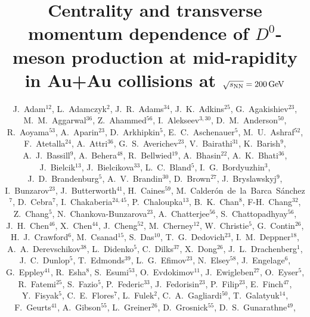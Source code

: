 \documentclass[%
 reprint,	
showpacs,
 amsmath,amssymb,
 aps,
 prc,
]{revtex4-1}
\begin{document}

\title{Centrality and transverse momentum dependence of $D^0$-meson production at mid-rapidity in Au+Au collisions at ${\sqrt{s_{\rm NN}} = \rm{200\,GeV}}$}%



\author{
J.~Adam$^{12}$,
L.~Adamczyk$^{2}$,
J.~R.~Adams$^{34}$,
J.~K.~Adkins$^{25}$,
G.~Agakishiev$^{23}$,
M.~M.~Aggarwal$^{36}$,
Z.~Ahammed$^{56}$,
I.~Alekseev$^{3,30}$,
D.~M.~Anderson$^{50}$,
R.~Aoyama$^{53}$,
A.~Aparin$^{23}$,
D.~Arkhipkin$^{5}$,
E.~C.~Aschenauer$^{5}$,
M.~U.~Ashraf$^{52}$,
F.~Atetalla$^{24}$,
A.~Attri$^{36}$,
G.~S.~Averichev$^{23}$,
V.~Bairathi$^{31}$,
K.~Barish$^{9}$,
A.~J.~Bassill$^{9}$,
A.~Behera$^{48}$,
R.~Bellwied$^{19}$,
A.~Bhasin$^{22}$,
A.~K.~Bhati$^{36}$,
J.~Bielcik$^{13}$,
J.~Bielcikova$^{33}$,
L.~C.~Bland$^{5}$,
I.~G.~Bordyuzhin$^{3}$,
J.~D.~Brandenburg$^{5}$,
A.~V.~Brandin$^{30}$,
D.~Brown$^{27}$,
J.~Bryslawskyj$^{9}$,
I.~Bunzarov$^{23}$,
J.~Butterworth$^{41}$,
H.~Caines$^{59}$,
M.~Calder{\'o}n~de~la~Barca~S{\'a}nchez$^{7}$,
D.~Cebra$^{7}$,
I.~Chakaberia$^{24,45}$,
P.~Chaloupka$^{13}$,
B.~K.~Chan$^{8}$,
F-H.~Chang$^{32}$,
Z.~Chang$^{5}$,
N.~Chankova-Bunzarova$^{23}$,
A.~Chatterjee$^{56}$,
S.~Chattopadhyay$^{56}$,
J.~H.~Chen$^{46}$,
X.~Chen$^{44}$,
J.~Cheng$^{52}$,
M.~Cherney$^{12}$,
W.~Christie$^{5}$,
G.~Contin$^{26}$,
H.~J.~Crawford$^{6}$,
M.~Csanad$^{15}$,
S.~Das$^{10}$,
T.~G.~Dedovich$^{23}$,
I.~M.~Deppner$^{18}$,
A.~A.~Derevschikov$^{38}$,
L.~Didenko$^{5}$,
C.~Dilks$^{37}$,
X.~Dong$^{26}$,
J.~L.~Drachenberg$^{1}$,
J.~C.~Dunlop$^{5}$,
T.~Edmonds$^{39}$,
L.~G.~Efimov$^{23}$,
N.~Elsey$^{58}$,
J.~Engelage$^{6}$,
G.~Eppley$^{41}$,
R.~Esha$^{8}$,
S.~Esumi$^{53}$,
O.~Evdokimov$^{11}$,
J.~Ewigleben$^{27}$,
O.~Eyser$^{5}$,
R.~Fatemi$^{25}$,
S.~Fazio$^{5}$,
P.~Federic$^{33}$,
J.~Fedorisin$^{23}$,
P.~Filip$^{23}$,
E.~Finch$^{47}$,
Y.~Fisyak$^{5}$,
C.~E.~Flores$^{7}$,
L.~Fulek$^{2}$,
C.~A.~Gagliardi$^{50}$,
T.~Galatyuk$^{14}$,
F.~Geurts$^{41}$,
A.~Gibson$^{55}$,
L.~Greiner$^{26}$,
D.~Grosnick$^{55}$,
D.~S.~Gunarathne$^{49}$,
}
\end{document}
